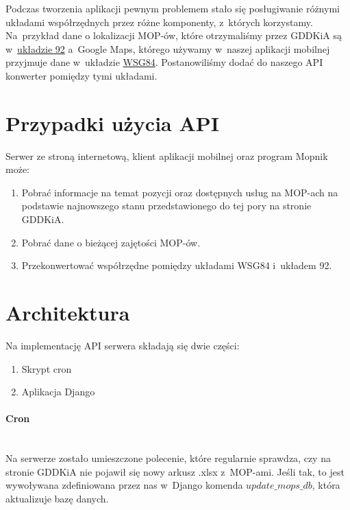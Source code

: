 Podczas tworzenia aplikacji pewnym problemem stało się posługiwanie różnymi układami współrzędnych przez różne komponenty, z~których korzystamy. Na~przykład dane o lokalizacji MOP-ów, które otrzymaliśmy przez GDDKiA są w~\href{https://pl.wikipedia.org/wiki/Uk\%C5\%82ad_wsp\%C3\%B3\%C5\%82rz\%C4\%99dnych_1992}{układzie 92}\cite{uklad-92} a~Google Maps, którego używamy w~naszej aplikacji mobilnej przyjmuje dane w~układzie \href{https://pl.wikipedia.org/wiki/System_odniesienia_WGS_84}{WSG84}. Postanowiliśmy dodać do naszego API konwerter pomiędzy tymi układami.
\section{Przypadki użycia API}
Serwer ze stroną internetową, klient aplikacji mobilnej oraz program Mopnik może:
\begin{enumerate}
\item Pobrać informacje na temat pozycji oraz dostępnych usług na MOP-ach na podstawie najnowszego stanu przedstawionego do tej pory na stronie GDDKiA.
\item Pobrać dane o bieżącej zajętości MOP-ów.
\item Przekonwertować współrzędne pomiędzy układami WSG84 i~układem 92.
\end{enumerate}
\section{Architektura}
Na implementację API serwera składają się dwie części:
\begin{enumerate}
\item Skrypt cron
\item Aplikacja Django
\end{enumerate}
\paragraph{Cron}\mbox{}\\
Na serwerze zostało umieszczone polecenie, które regularnie sprawdza, czy na stronie GDDKiA nie pojawił się nowy arkusz .xlsx z~MOP-ami. Jeśli tak, to jest wywoływana zdefiniowana przez nas w~Django komenda $\textit{update\_mops\_db}$, która aktualizuje bazę danych.
